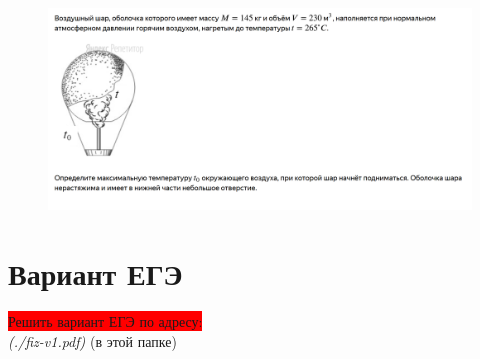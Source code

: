 \documentclass[a4paper,12pt]{article} %
\begin{document}
\begin{figure}[H]
\centering
  \includegraphics[width=1.1\linewidth]{6.PNG}
  \label{task2}
\end{figure}


\section{Вариант ЕГЭ}
\colorbox{Red}{Решить вариант ЕГЭ по адресу:}
 \\ \textit{(./fiz-v1.pdf)} (в этой папке)
\end{document}
